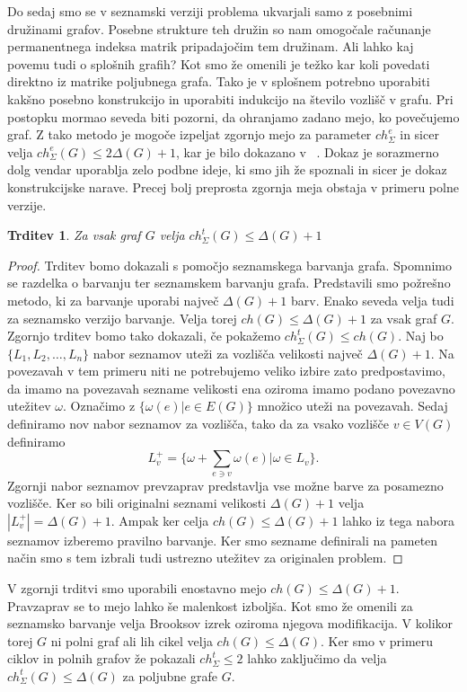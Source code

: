 \documentclass[12pt,a4paper,twoside]{article}
\theoremstyle{definition} %
\theoremstyle{plain} %
\newtheorem{trditev}[definicija]{Trditev}
\numberwithin{equation}{section}  %
\begin{document}
Do sedaj smo se v seznamski verziji problema ukvarjali samo z posebnimi družinami grafov. Posebne strukture teh družin so nam omogočale računanje permanentnega indeksa matrik pripadajočim tem družinam. Ali lahko kaj povemu tudi o splošnih grafih? Kot smo že omenili je težko kar koli povedati direktno iz matrike poljubnega grafa. Tako je v splošnem potrebno uporabiti kakšno posebno konstrukcijo in uporabiti indukcijo na število vozlišč v grafu. Pri postopku mormao seveda biti pozorni, da ohranjamo zadano mejo, ko povečujemo graf. Z tako metodo je mogoče izpeljat zgornjo mejo za parameter $ch_{\Sigma}^e$ in sicer velja $ch_{\Sigma}^e(G) \le 2 \Delta(G) + 1$, kar je bilo dokazano v ~\citet{listbounds}. Dokaz je sorazmerno dolg vendar uporablja zelo podbne ideje, ki smo jih že spoznali in sicer je dokaz konstrukcijske narave. Precej bolj preprosta zgornja meja obstaja v primeru polne verzije.
\begin{trditev}
Za vsak graf $G$ velja $ch_{\Sigma}^t(G) \le  \Delta(G) + 1$
\end{trditev}
\begin{proof}
Trditev bomo dokazali s pomočjo seznamskega barvanja grafa. Spomnimo se razdelka o barvanju ter seznamskem barvanju grafa. Predstavili smo požrešno metodo, ki za barvanje uporabi največ $\Delta(G) + 1$ barv. Enako seveda velja tudi za seznamsko verzijo barvanje. Velja torej $ch(G) \le \Delta(G) +1$ za vsak graf $G$. Zgornjo trditev bomo tako dokazali, če pokažemo $ch_{\Sigma}^t(G) \le ch(G)$.
Naj bo $\{L_1, L_2, \ldots, L_n\}$ nabor seznamov uteži za vozlišča velikosti največ $\Delta(G) + 1$. Na povezavah v tem primeru niti ne potrebujemo veliko izbire zato predpostavimo, da imamo na povezavah sezname velikosti ena oziroma imamo podano povezavno utežitev $\omega$. Označimo z $\{\omega(e) | e \in E(G)\}$ množico uteži na povezavah. Sedaj definiramo nov nabor seznamov za vozlišča, tako da za vsako vozlišče $v \in V(G)$ definiramo
$$L_{v}^+ = \{ \omega + \sum_{e\ni v} \omega(e) | \omega \in L_v\}. $$
Zgornji nabor seznamov prevzaprav predstavlja vse možne barve za posamezno vozlišče. Ker so bili originalni seznami velikosti $\Delta(G) + 1$ velja $|L_{v}^+| =\Delta(G) + 1$. Ampak ker celja $ch(G) \le \Delta(G) +1$ lahko iz tega nabora seznamov izberemo pravilno barvanje. Ker smo sezname definirali na pameten način smo s tem izbrali tudi ustrezno utežitev za originalen problem.
\end{proof}
V zgornji trditvi smo uporabili enostavno mejo $ch(G) \le \Delta(G) + 1$. Pravzaprav se to mejo lahko še malenkost izboljša. Kot smo že omenili za seznamsko barvanje velja Brooksov izrek oziroma njegova modifikacija. V kolikor torej $G$ ni polni graf ali lih cikel velja $ch(G) \le \Delta(G)$. Ker smo v primeru ciklov in polnih grafov že pokazali $ch_{\Sigma}^t \le 2$ lahko zaključimo da velja $ch_{\Sigma}^t(G) \le \Delta(G)$ za poljubne grafe $G$.
\end{document}
